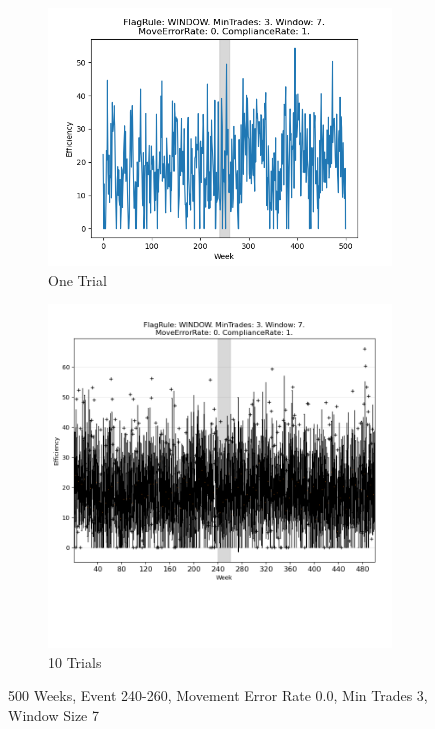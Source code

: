 \documentclass{article}%
\begin{document}
%


\begin{figure}[!htb]%
\begin{subfigure}[b]{0.45\linewidth}%
\includegraphics[width=\linewidth]{2055fr_WINDOW_mt_3_ws_7_er_0_cr_1_t1.png}%
\caption{One Trial}%
\end{subfigure}%
\begin{subfigure}[b]{0.45\linewidth}%
\includegraphics[clip,width=\linewidth,trim=0 4cm 0 0]{2055fr_WINDOW_mt_3_ws_7_er_0_cr_1_t10.png}%
\caption{10 Trials}%
\end{subfigure}%
\caption{500 Weeks, Event 240{-}260, Movement Error Rate 0.0, Min Trades 3, Window Size 7}%
\end{figure}
\end{document}
